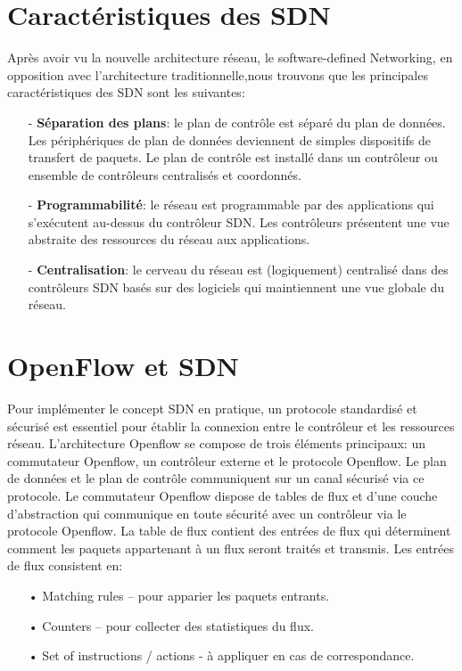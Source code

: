 \section{Caractéristiques des SDN}
Après avoir vu la nouvelle architecture réseau, le software-defined Networking, en opposition avec l'architecture traditionnelle,nous trouvons que les principales caractéristiques des SDN sont les suivantes:\\
\begin{itemize}
\item[-]\textbf{Séparation des plans}: le plan de contrôle est séparé du plan de données. Les périphériques de plan de données deviennent de simples dispositifs de transfert de paquets. Le plan de contrôle est installé dans un contrôleur ou ensemble de contrôleurs centralisés et coordonnés.\\
\item[-]\textbf{Programmabilité}: le réseau est programmable par des applications qui s’exécutent au-dessus du contrôleur SDN. Les contrôleurs présentent une vue abstraite des ressources du réseau aux applications.\\
\item[-]\textbf{Centralisation}: le cerveau du réseau est (logiquement) centralisé dans des contrôleurs SDN basés sur des logiciels qui maintiennent une vue globale du réseau.
\end{itemize}

\section{OpenFlow et SDN}
\label{S_OpenFlow}
Pour implémenter le concept SDN en pratique, un protocole standardisé et sécurisé est essentiel  pour établir la connexion entre le contrôleur et les ressources réseau. L’architecture Openflow se compose de trois éléments principaux: un commutateur Openflow, un contrôleur externe et le protocole Openflow. Le plan de données et le plan de contrôle communiquent sur un canal sécurisé via ce protocole. Le commutateur Openflow dispose de tables de flux et d’une couche d’abstraction qui communique en toute sécurité avec un contrôleur via le protocole Openflow. La table de flux contient des entrées de flux qui déterminent comment les paquets appartenant à un flux seront traités et transmis. 
Les entrées de flux consistent en:\\

\begin{itemize}
\item[•] Matching rules – pour apparier les paquets entrants.
\item[•] Counters – pour collecter des statistiques du flux.
\item[•] Set of instructions / actions - à appliquer en cas de correspondance.\\
\end{itemize}

